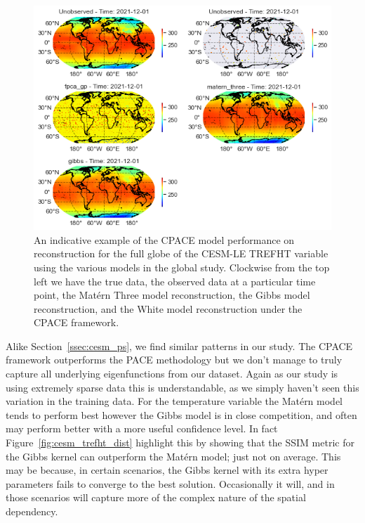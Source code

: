 \begin{figure}
	\centering
	\includegraphics[width=\textwidth]{full_ex_trefht_globe}
	\caption{An indicative example of the CPACE model performance on reconstruction for the full globe of the CESM-LE TREFHT variable using the various models in the global study. Clockwise from the top left we have the true data, the observed data at a particular time point, the Mat\'ern Three model reconstruction, the Gibbs model reconstruction, and the White model reconstruction under the CPACE framework.}
	\label{fig:full_ex_trefht_globe}
\end{figure}

Alike Section~\ref{ssec:cesm_ps}, we find similar patterns in our study.
The CPACE framework outperforms the PACE methodology but we don't manage to truly capture all underlying eigenfunctions from our dataset.
Again as our study is using extremely sparse data this is understandable, as we simply haven't seen this variation in the training data.
For the temperature variable the Mat\'ern model tends to perform best however the Gibbs model is in close competition, and often may perform better with a more useful confidence level.
In fact Figure~\ref{fig:cesm_trefht_dist} highlight this by showing that the SSIM metric for the Gibbs kernel can outperform the Mat\'ern model; just not on average.
This may be because, in certain scenarios, the Gibbs kernel with its extra hyper parameters fails to converge to the best solution. 
Occasionally it will, and in those scenarios will capture more of the complex nature of the spatial dependency. 

